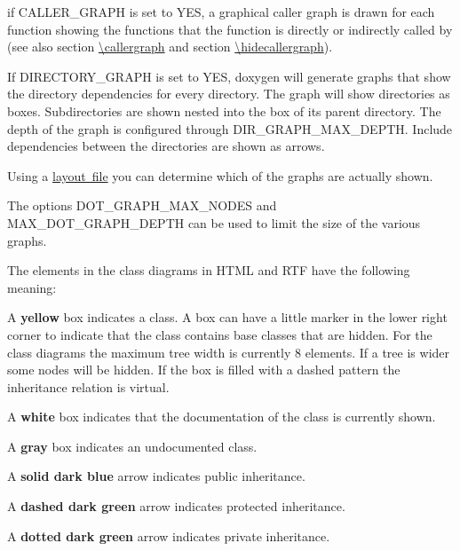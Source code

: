 \begin{DoxyItemize}
\item if C\+A\+L\+L\+E\+R\+\_\+\+G\+R\+A\+PH is set to Y\+ES, a graphical caller graph is drawn for each function showing the functions that the function is directly or indirectly called by (see also section \mbox{\hyperlink{commands_cmdcallergraph}{\textbackslash{}callergraph}} and section \mbox{\hyperlink{commands_cmdhidecallergraph}{\textbackslash{}hidecallergraph}}). 
\item If D\+I\+R\+E\+C\+T\+O\+R\+Y\+\_\+\+G\+R\+A\+PH is set to {\ttfamily Y\+ES}, doxygen will generate graphs that show the directory dependencies for every directory. The graph will show directories as boxes. Subdirectories are shown nested into the box of its parent directory. The depth of the graph is configured through D\+I\+R\+\_\+\+G\+R\+A\+P\+H\+\_\+\+M\+A\+X\+\_\+\+D\+E\+P\+TH. Include dependencies between the directories are shown as arrows. 
\end{DoxyItemize}

Using a \mbox{\hyperlink{customize}{layout file}} you can determine which of the graphs are actually shown.

The options D\+O\+T\+\_\+\+G\+R\+A\+P\+H\+\_\+\+M\+A\+X\+\_\+\+N\+O\+D\+ES and M\+A\+X\+\_\+\+D\+O\+T\+\_\+\+G\+R\+A\+P\+H\+\_\+\+D\+E\+P\+TH can be used to limit the size of the various graphs.

The elements in the class diagrams in H\+T\+ML and R\+TF have the following meaning\+: 
\begin{DoxyItemize}
\item A {\bfseries{yellow}} box indicates a class. A box can have a little marker in the lower right corner to indicate that the class contains base classes that are hidden. For the class diagrams the maximum tree width is currently 8 elements. If a tree is wider some nodes will be hidden. If the box is filled with a dashed pattern the inheritance relation is virtual. 
\item A {\bfseries{white}} box indicates that the documentation of the class is currently shown. 
\item A {\bfseries{gray}} box indicates an undocumented class. 
\item A {\bfseries{solid dark blue}} arrow indicates public inheritance. 
\item A {\bfseries{dashed dark green}} arrow indicates protected inheritance. 
\item A {\bfseries{dotted dark green}} arrow indicates private inheritance. 
\end{DoxyItemize}

